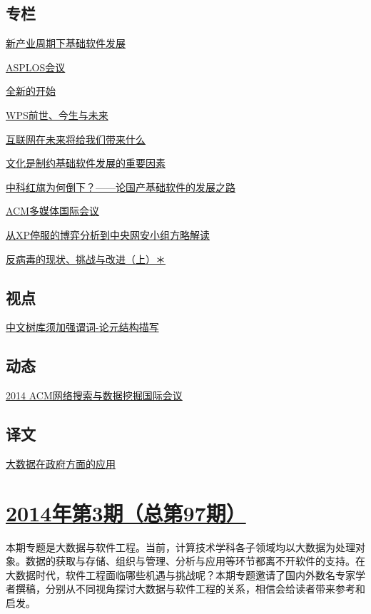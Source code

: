 \documentclass[a4paper]{article}
\begin{document}
\subsection{专栏}
\href{http://history.ccf.org.cn/resources/1190201776262/2014/04/11/11.pdf}{新产业周期下基础软件发展}

\href{http://history.ccf.org.cn/resources/1190201776262/2014/04/11/14.pdf}{ASPLOS会议}

\href{http://history.ccf.org.cn/resources/1190201776262/2014/04/11/13.pdf}{全新的开始}

\href{http://history.ccf.org.cn/resources/1190201776262/2014/04/11/12.pdf}{WPS前世、今生与未来}

\href{http://history.ccf.org.cn/resources/1190201776262/2014/04/11/8-1.pdf}{互联网在未来将给我们带来什么}

\href{http://history.ccf.org.cn/resources/1190201776262/2014/04/11/10.pdf}{文化是制约基础软件发展的重要因素}

\href{http://history.ccf.org.cn/resources/1190201776262/2014/04/11/9.pdf}{中科红旗为何倒下？——论国产基础软件的发展之路}

\href{http://history.ccf.org.cn/resources/1190201776262/2014/04/11/15.pdf}{ACM多媒体国际会议}

\href{http://history.ccf.org.cn/resources/1190201776262/2014/04/11/7.pdf}{从XP停服的博弈分析到中央网安小组方略解读}

\href{http://history.ccf.org.cn/resources/1190201776262/2014/04/11/6.pdf}{反病毒的现状、挑战与改进（上）＊}

\subsection{视点}
\href{http://history.ccf.org.cn/resources/1190201776262/2014/04/11/16.pdf}{中文树库须加强谓词-论元结构描写}

\subsection{动态}
\href{http://history.ccf.org.cn/resources/1190201776262/2014/04/11/17.pdf}{2014 ACM网络搜索与数据挖掘国际会议}

\subsection{译文}
\href{http://history.ccf.org.cn/resources/1190201776262/2014/04/11/18.pdf}{大数据在政府方面的应用}


\section{\href{http://history.ccf.org.cn/sites/ccf/jsjtbbd.jsp?contentId=2788790450856}{\textbf{2014年第3期（总第97期）}}}
本期专题是大数据与软件工程。当前，计算技术学科各子领域均以大数据为处理对象。数据的获取与存储、组织与管理、分析与应用等环节都离不开软件的支持。在大数据时代，软件工程面临哪些机遇与挑战呢？本期专题邀请了国内外数名专家学者撰稿，分别从不同视角探讨大数据与软件工程的关系，相信会给读者带来参考和启发。
\end{document}

